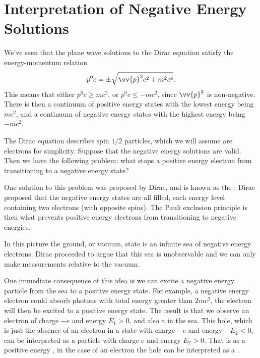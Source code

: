 \documentclass[fleqn]{NotesClass}
\begin{document}
    \section{Interpretation of Negative Energy Solutions}
    We've seen that the plane wave solutions to the Dirac equation satisfy the energy-momentum relation
    \begin{equation}
        p^0c = \pm \sqrt{\vv{p}^2c^2 + m^2c^4}.
    \end{equation}
    This means that either \(p^0c \ge mc^2\), or \(p^0c \le -mc^2\), since \(\vv{p}^2\) is non-negative.
    There is then a continuum of positive energy states with the lowest energy being \(mc^2\), and a continuum of negative energy states with the highest energy being \(-mc^2\).
    
    The Dirac equation describes spin \(1/2\) particles, which we will assume are electrons for simplicity.
    Suppose that the negative energy solutions are valid.
    Then we have the following problem: what stops a positive energy electron from transitioning to a negative energy state?
    
    One solution to this problem was proposed by Dirac, and is known as the .
    Dirac proposed that the negative energy states are all filled, each energy level containing two electrons (with opposite spins).
    The Pauli exclusion principle is then what prevents positive energy electrons from transitioning to negative energies.
    
    In this picture the ground, or vacuum, state is an infinite sea of negative energy electrons.
    Dirac proceeded to argue that this sea is unobservable and we can only make measurements relative to the vacuum.
    
    One immediate consequence of this idea is we can excite a negative energy particle from the sea to a positive energy state.
    For example, a negative energy electron could absorb photons with total energy greater than \(2mc^2\), the electron will then be excited to a positive energy state.
    The result is that we observe an electron of charge \(-e\) and energy \(E_1 > 0\), and also a  in the sea.
    This hole, which is just the absence of an electron in a state with charge \(-e\) and energy \(-E_2 < 0\), can be interpreted as a particle with charge \(e\) and energy \(E_2 > 0\).
    That is as a positive energy , in the case of an electron the hole can be interpreted as a .
    
\end{document}
